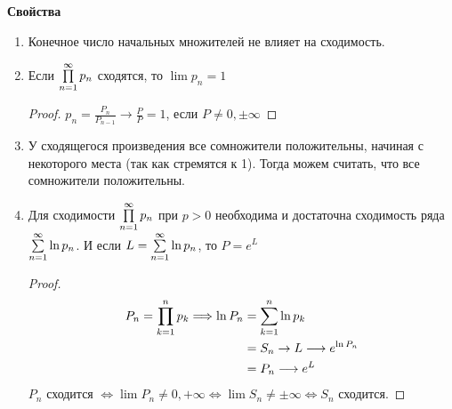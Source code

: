 \textbf{Свойства}
\begin{enumerate}
    \item Конечное число начальных множителей не влияет на сходимость.
    \item Если $\prod \limits_{n=1}^\infty p_n$ сходятся, то $\lim p_n = 1$
    \begin{proof}
        $p_n = \frac{P_n}{P_{n-1}} \to \frac{P}{P} = 1$, если $P \neq 0, \pm \infty$
    \end{proof}
    \item У сходящегося произведения все сомножители положительны, начиная с некоторого места (так как стремятся к 1). Тогда можем считать, что все сомножители положительны.
    \item Для сходимости $\prod \limits_{n=1}^\infty p_n$ при $p > 0$ необходима и достаточна сходимость ряда $\sum \limits_{n=1}^\infty \ln p_n$.
    И если $L = \sum \limits_{n=1}^\infty \ln p_n$, то $P = e^L$
    \begin{proof}
        \begin{align*}
            P_n = \prod \limits_{k=1}^n p_k \Longrightarrow \ln P_n &= \sum \limits_{k=1}^n \ln p_k \\
            &= S_n \to L \longrightarrow e^{\ln P_n} \\
            &= P_n \longrightarrow e^L
        \end{align*}
        $P_n$ сходится $\Longleftrightarrow \lim P_n \neq 0, +\infty \Longleftrightarrow \lim S_n \neq \pm \infty \Longleftrightarrow S_n$ сходится.
    \end{proof}
\end{enumerate}